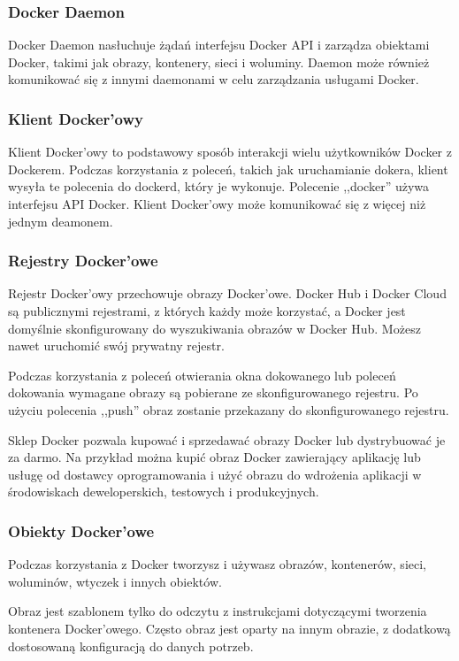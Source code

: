 \subsubsection{Docker Daemon}
Docker Daemon nasłuchuje żądań interfejsu Docker API i zarządza obiektami Docker, takimi jak obrazy, kontenery, sieci i woluminy. Daemon może również komunikować się z innymi daemonami w celu zarządzania usługami Docker. \cite{Docker2}

\subsubsection{Klient Docker'owy}
Klient Docker'owy to podstawowy sposób interakcji wielu użytkowników Docker z Dockerem. Podczas korzystania z poleceń, takich jak uruchamianie dokera, klient wysyła te polecenia do dockerd, który je wykonuje. Polecenie ,,docker'' używa interfejsu API Docker. Klient Docker'owy może komunikować się z więcej niż jednym deamonem. \cite{Docker2}


\subsubsection{Rejestry Docker'owe}
Rejestr Docker'owy przechowuje obrazy Docker'owe. Docker Hub i Docker Cloud są publicznymi rejestrami, z których każdy może korzystać, a Docker jest domyślnie skonfigurowany do wyszukiwania obrazów w Docker Hub. Możesz nawet uruchomić swój prywatny rejestr. 

Podczas korzystania z poleceń otwierania okna dokowanego lub poleceń dokowania wymagane obrazy są pobierane ze skonfigurowanego rejestru. Po użyciu polecenia ,,push'' obraz zostanie przekazany do skonfigurowanego rejestru.

Sklep Docker pozwala kupować i sprzedawać obrazy Docker lub dystrybuować je za darmo. Na przykład można kupić obraz Docker zawierający aplikację lub usługę od dostawcy oprogramowania i użyć obrazu do wdrożenia aplikacji w środowiskach deweloperskich, testowych i produkcyjnych.

\subsubsection{Obiekty Docker'owe}
Podczas korzystania z Docker tworzysz i używasz obrazów, kontenerów, sieci, woluminów, wtyczek i innych obiektów.

Obraz jest szablonem tylko do odczytu z instrukcjami dotyczącymi tworzenia kontenera Docker'owego. Często obraz jest oparty na innym obrazie, z dodatkową dostosowaną konfiguracją do danych potrzeb.

